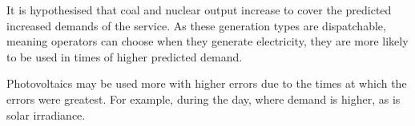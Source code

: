It is hypothesised that coal and nuclear output increase to cover the predicted increased demands of the service. As these generation types are dispatchable, meaning operators can choose when they generate electricity, they are more likely to be used in times of higher predicted demand.

Photovoltaics may be used more with higher errors due to the times at which the errors were greatest. For example, during the day, where demand is higher, as is solar irradiance.






%
%
%
%
%
%



